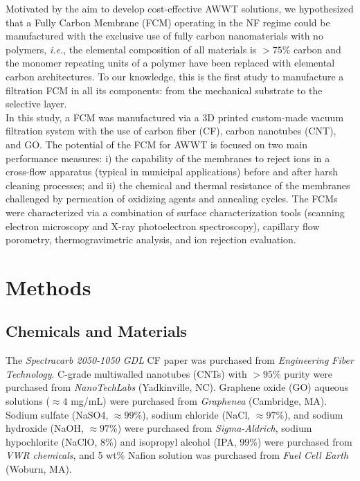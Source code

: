 Motivated by the aim to develop cost-effective AWWT solutions, we hypothesized that a Fully Carbon Membrane (FCM) operating in the NF regime could be manufactured with the exclusive use of fully carbon nanomaterials with no polymers, \textit{i.e.}, the elemental composition of all materials is $>75$\% carbon and the monomer repeating units of a polymer have been replaced with elemental carbon architectures. To our knowledge, this is the first study to manufacture a filtration FCM in all its components: from the mechanical substrate to the selective layer.\cite{goh2015all}\\
In this study, a FCM was manufactured via a 3D printed custom-made vacuum filtration system with the use of carbon fiber (CF), carbon nanotubes (CNT), and GO. The potential of the FCM for AWWT is focused on two main performance measures: i) the capability of the membranes to reject ions in a cross-flow apparatus (typical in municipal applications) before and after harsh cleaning processes; and ii) the chemical and thermal resistance of the membranes challenged by permeation of oxidizing agents and annealing cycles. The FCMs were characterized via a combination of surface characterization tools (scanning electron microscopy and X-ray photoelectron spectroscopy), capillary flow porometry, thermogravimetric analysis, and ion rejection evaluation. 


\section{Methods}

\subsection{Chemicals and Materials}
The \textit{Spectracarb 2050-1050 GDL} CF paper was purchased from \textit{Engineering Fiber Technology}. C-grade multiwalled nanotubes (CNTs) with $>95$\% purity were purchased from \textit{NanoTechLabs} (Yadkinville, NC). Graphene oxide (GO) aqueous solutions ($\approx4$ mg/mL) were purchased from \textit{Graphenea} (Cambridge, MA). Sodium sulfate (NaSO4, $\approx99$\%), sodium chloride (NaCl, $\approx97$\%), and sodium hydroxide (NaOH, $\approx97$\%) were purchased from \textit{Sigma-Aldrich}, sodium hypochlorite (NaClO, 8\%) and isopropyl alcohol (IPA, 99\%) were purchased from \textit{VWR chemicals}, and 5 wt\%  Nafion solution was purchased from \textit{Fuel Cell Earth} (Woburn, MA).

